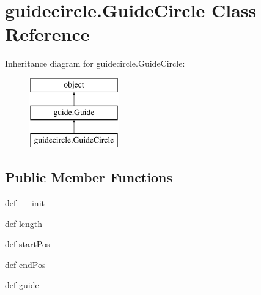 \hypertarget{classguidecircle_1_1GuideCircle}{}\section{guidecircle.\+Guide\+Circle Class Reference}
\label{classguidecircle_1_1GuideCircle}
Inheritance diagram for guidecircle.\+Guide\+Circle\+:\begin{figure}[H]
\begin{center}
\leavevmode
\includegraphics[height=3.000000cm]{classguidecircle_1_1GuideCircle}
\end{center}
\end{figure}
\subsection*{Public Member Functions}
\begin{DoxyCompactItemize}
\item 
def \hyperlink{classguidecircle_1_1GuideCircle_a4ddf3ffdbdcc8501961995781483f0c1}{\+\_\+\+\_\+init\+\_\+\+\_\+}
\item 
def \hyperlink{classguidecircle_1_1GuideCircle_ae972bed60ff0f9b13b948ea2db444171}{length}
\item 
def \hyperlink{classguidecircle_1_1GuideCircle_ad81f6a7568518a4b75e34d26ca32ff92}{start\+Pos}
\item 
def \hyperlink{classguidecircle_1_1GuideCircle_a335c426b28719aa6f851d99ed87b3a0b}{end\+Pos}
\item 
def \hyperlink{classguidecircle_1_1GuideCircle_ab5bce1378b16cc4a09b5753b7d316670}{guide}
\end{DoxyCompactItemize}

